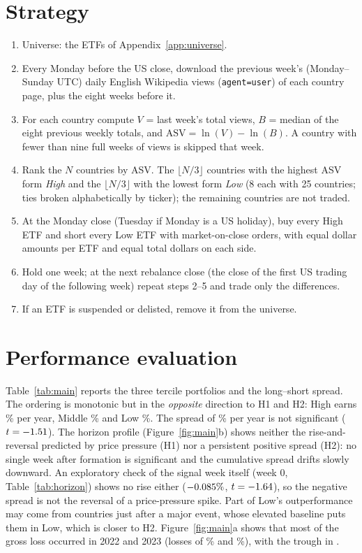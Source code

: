 \documentclass[11pt,a4paper]{article}
\begin{document}
\section{Strategy}
\begin{enumerate}[leftmargin=*]
  \item Universe: the \NEtfs{} ETFs of Appendix~\ref{app:universe}.
  \item Every Monday before the US close, download the previous week's (Monday--Sunday UTC) daily
        English Wikipedia views (\texttt{agent=user}) of each country page, plus the eight weeks before it.
  \item For each country compute $V$ = last week's total views, $B$ = median of the eight previous
        weekly totals, and $\mathrm{ASV} = \ln(V) - \ln(B)$. A country with fewer than nine full weeks
        of views is skipped that week.
  \item Rank the $N$ countries by ASV. The $\lfloor N/3\rfloor$ countries with the highest ASV form
        \emph{High} and the $\lfloor N/3\rfloor$ with the lowest form \emph{Low} (8 each with
        25 countries; ties broken alphabetically by ticker); the remaining countries are not traded.
  \item At the Monday close (Tuesday if Monday is a US holiday), buy every High ETF and short every
        Low ETF with market-on-close orders, with equal dollar amounts per ETF and equal total dollars on each side.
  \item Hold one week; at the next rebalance close (the close of the first US trading day of the
        following week) repeat steps 2--5 and trade only the differences.
  \item If an ETF is suspended or delisted, remove it from the universe.
\end{enumerate}

\section{Performance evaluation}\label{sec:perf}

Table~\ref{tab:main} reports the three tercile portfolios and the long--short spread.
The ordering is monotonic but in the \emph{opposite} direction to H1 and H2: High earns
\HighAnn\% per year, Middle \MiddleAnn\% and Low \LowAnn\%. The spread of \LSAnn\% per year is not
significant ($t=-1.51$). The horizon profile (Figure~\ref{fig:main}b) shows
neither the rise-and-reversal predicted by price pressure (H1) nor a persistent positive spread
(H2): no single week after formation is significant and the cumulative spread drifts slowly
downward. An exploratory check of the signal week itself (week 0, Table~\ref{tab:horizon}) shows no rise
either ($-0.085\%$, $t=-1.64$), so the negative spread is not the reversal of a price-pressure
spike. Part of Low's outperformance may come from countries just after a major event, whose elevated
baseline puts them in Low, which is closer to H2.
Figure~\ref{fig:main}a shows that most of the gross loss occurred in 2022 and 2023 (losses of \LossTwentyTwo\% and
\LossTwentyThree\%), with the trough in \TroughDate.
\end{document}
